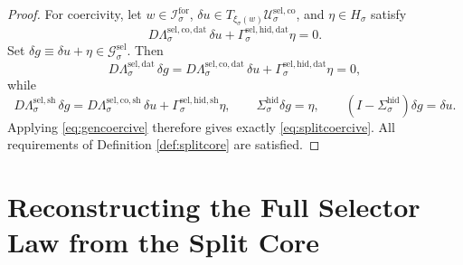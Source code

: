 \documentclass[11pt]{article}
\newcommand{\ForSpace}[1]{\mathcal I_{#1}^{\mathrm{for}}}
\newcommand{\GenSpace}[1]{\mathcal G_{#1}^{\mathrm{sel}}}
\newcommand{\GenData}[1]{\Lambda_{#1}^{\mathrm{sel,dat}}}
\newcommand{\GenShell}[1]{\Lambda_{#1}^{\mathrm{sel,sh}}}
\newcommand{\HiddenSel}[1]{\Sigma_{#1}^{\mathrm{hid}}}
\newcommand{\GapSpace}[1]{H_{#1}}
\newcommand{\SelCoreSpace}[1]{\mathcal U_{#1}^{\mathrm{sel,co}}}
\newcommand{\SelCoreData}[1]{\Lambda_{#1}^{\mathrm{sel,co,dat}}}
\newcommand{\SelCoreShell}[1]{\Lambda_{#1}^{\mathrm{sel,co,sh}}}
\newcommand{\SelHiddenData}[1]{\Gamma_{#1}^{\mathrm{sel,hid,dat}}}
\newcommand{\SelHiddenShell}[1]{\Gamma_{#1}^{\mathrm{sel,hid,sh}}}
\newcommand{\SelCoreEmbed}[1]{\xi_{#1}}
\begin{document}
\begin{proof}
For coercivity, let \(w\in\ForSpace{\sigma}\), \(\delta u\in T_{\SelCoreEmbed{\sigma}(w)}\SelCoreSpace{\sigma}\), and \(\eta\in\GapSpace{\sigma}\) satisfy
\[
D\SelCoreData{\sigma}\,\delta u+\SelHiddenData{\sigma}\eta=0.
\]
Set \(\delta g\equiv \delta u+\eta\in\GenSpace{\sigma}\). Then
\[
D\GenData{\sigma}\,\delta g
=
D\SelCoreData{\sigma}\,\delta u+\SelHiddenData{\sigma}\eta
=
0,
\]
while
\[
D\GenShell{\sigma}\,\delta g
=
D\SelCoreShell{\sigma}\,\delta u+\SelHiddenShell{\sigma}\eta,
\qquad
\HiddenSel{\sigma}\delta g=\eta,
\qquad
(I-\HiddenSel{\sigma})\delta g=\delta u.
\]
Applying \eqref{eq:gencoercive} therefore gives exactly \eqref{eq:splitcoercive}. All requirements of Definition \ref{def:splitcore} are satisfied.
\end{proof}

\section{Reconstructing the Full Selector Law from the Split Core}
\end{document}
